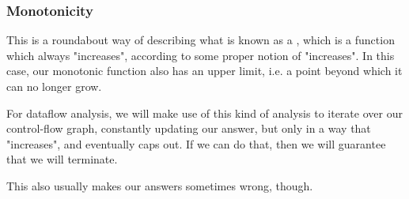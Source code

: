\documentclass[aspectratio=169, handout]{beamer}
\begin{document}
 \begin{frame}[fragile]
   \frametitle{Monotonicity}

   This is a roundabout way of describing what is known as a ,
   which is a function which always "increases", according to some proper notion of
   "increases". In this case, our monotonic function also has an upper limit, i.e.
   a point beyond which it can no longer grow.

   \pause
   \vspace{\fill}

   For dataflow analysis, we will make use of this kind of analysis to iterate over
   our control-flow graph, constantly updating our answer, but only in a way that
   "increases", and eventually caps out. If we can do that, then we will
   guarantee that we will terminate.

   \pause
   \vspace{\fill}

   This also usually makes our answers sometimes wrong, though.
 \end{frame}
\end{document}
